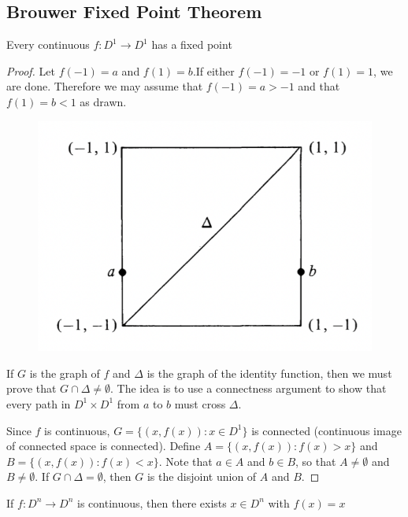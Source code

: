\documentclass[11pt]{article}
\begin{document}
\subsection{Brouwer Fixed Point Theorem}
\label{sec:orgd3dab52}
\begin{theorem}[]
Every continuous \(f:D^1\to D^1\) has a fixed point
\end{theorem}

\begin{proof}
Let \(f(-1)=a\) and \(f(1)=b\).If either \(f(-1)=-1\) or \(f(1)=1\), we are done. Therefore we
may assume that \(f(-1)=a>-1\) and that \(f(1)=b<1\) as drawn.
\begin{figure}[htbp]
\centering
\includegraphics[width=.5\textwidth]{../images/AnIntroductionToAlgebraicTopology/1.png}
\label{}
\end{figure}
If \(G\) is the graph of \(f\) and \(\Delta\) is the graph of the identity function, then we must prove
that \(G\cap\Delta\neq\emptyset\). The idea is to use a connectness argument to show that every path in \(D^1\times D^1\)
from \(a\) to \(b\) must cross \(\Delta\).

Since \(f\) is continuous, \(G=\{(x,f(x)):x\in D^1\}\) is connected (continuous image of connected
space is connected). Define \(A=\{(x,f(x)):f(x)>x\}\)  and \(B=\{(x,f(x)):f(x)<x\}\). Note
that \(a\in A\) and \(b\in B\), so that \(A\neq\emptyset\) and \(B\neq\emptyset\). If \(G\cap\Delta=\emptyset\), then \(G\) is the disjoint
union of \(A\) and \(B\).
\end{proof}


\begin{theorem}
If \(f:D^n\to D^n\) is continuous, then there exists \(x\in D^n\) with \(f(x)=x\)
\end{theorem}
\end{document}
